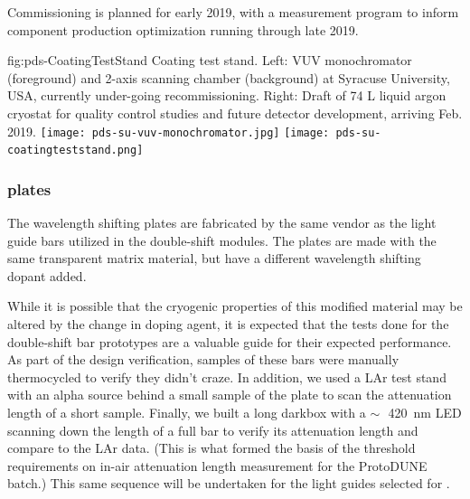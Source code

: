  Commissioning is planned for early 2019, with a measurement program to inform component production optimization running through late 2019. 

\begin{dunefigure}
 {fig:pds-CoatingTestStand}
 { Coating test stand. Left: VUV monochromator (foreground) and 2-axis scanning chamber (background) at Syracuse University, USA, currently under-going recommissioning. Right: Draft of 74 L liquid argon cryostat for quality control studies and future detector development, arriving Feb. 2019.}
\texttt{[image: pds-su-vuv-monochromator.jpg]}
\hspace{0.02\textwidth}
\texttt{[image: pds-su-coatingteststand.png]}
\end{dunefigure}



\subsubsection{ plates}

The  wavelength shifting plates are fabricated by the same vendor as the light guide bars utilized in the double-shift  modules.  The   plates are made with the same transparent matrix material, but have a different wavelength shifting dopant added.  

While it is possible that the cryogenic properties of this modified  material may be altered by the change in doping agent, it is expected that the tests done for the double-shift bar prototypes are a valuable guide for their expected performance.  As part of the design verification, samples of these bars were manually thermocycled to verify they didn't craze. In addition, we used 
a LAr test stand 
with an alpha source behind a small sample of the  plate to scan the attenuation length of a short sample. Finally, we built a long darkbox with a $\sim\,$~\SI{420}{nm} LED scanning down the length of a full bar to verify its attenuation length and compare to the LAr data. (This is what formed the basis of the threshold requirements on in-air attenuation length measurement for the ProtoDUNE batch.) 
This same sequence will be undertaken for the light guides selected for . 

